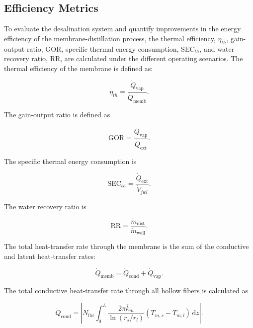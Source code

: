\documentclass[14pt,letterpaper,fleqn]{extarticle}
\begin{document}
\subsection{Efficiency Metrics}
\label{subsec:efficiency-metrics}

To evaluate the desalination system and quantify improvements in the energy
efficiency of the membrane-distillation process, the thermal efficiency,
$\eta_{th}$, gain-output ratio, $\mathrm{GOR}$, specific thermal energy
consumption, $\mathrm{SEC}_{th}$, and water recovery ratio, $\mathrm{RR}$, are
calculated under the different operating scenarios. The thermal efficiency of 
the membrane is defined as:

\begin{equation}
\eta_{th}
=
\frac{
\dot{Q}_{\mathrm{vap}}
}{
\dot{Q}_{\mathrm{memb}}
}.
\label{eq:thermal-efficiency}
\end{equation}

The gain-output ratio is defined as

\begin{equation}
\mathrm{GOR}
=
\frac{
\dot{Q}_{\mathrm{vap}}
}{
\dot{Q}_{\mathrm{ext}}
}.
\label{eq:gor}
\end{equation}

The specific thermal energy consumption is

\begin{equation}
\mathrm{SEC}_{th}
=
\frac{
\dot{Q}_{\mathrm{ext}}
}{
\dot{V}_{jwl}
}.
\label{eq:sec-thermal}
\end{equation}

The water recovery ratio is

\begin{equation}
\mathrm{RR}
=
\frac{
\dot{m}_{\mathrm{dist}}
}{
\dot{m}_{\mathrm{well}}
}.
\label{eq:water-recovery-ratio}
\end{equation}

The total heat-transfer rate through the membrane is the sum of the conductive
and latent heat-transfer rates:

\begin{equation}
\dot{Q}_{\mathrm{memb}}
=
\dot{Q}_{\mathrm{cond}}
+
\dot{Q}_{\mathrm{vap}}.
\label{eq:total-membrane-heat}
\end{equation}

The total conductive heat-transfer rate through all hollow fibers is calculated
as

\begin{equation}
\dot{Q}_{\mathrm{cond}}
=
\left|
N_{\mathrm{fbr}}
\int_{0}^{L}
\frac{
2\pi\overline{k}_m
}{
\ln\left(r_s/r_l\right)
}
\left(
T_{m,s}-T_{m,l}
\right)
\,\mathrm{d}z
\right|.
\label{eq:total-conductive-heat}
\end{equation}
\end{document}
